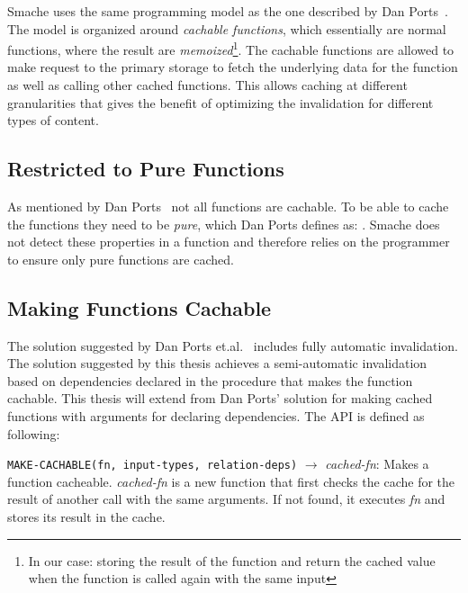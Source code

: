 Smache uses the same programming model as the one described by Dan Ports~\cite{paper:liskov}. The model is organized around \emph{cachable functions}, which essentially are normal functions, where the result are \emph{memoized}\footnote{In our case: storing the result of the function and return the cached value when the function is called again with the same input}. The cachable functions are allowed to make request to the primary storage to fetch the underlying data for the function as well as calling other cached functions. This allows caching at different granularities that gives the benefit of optimizing the invalidation for different types of content.


\subsection{Restricted to Pure Functions}
\label{subsec:restricted_to_pure_functions}

As mentioned by Dan Ports~\cite{paper:liskov} not all functions are cachable. To be able to cache the functions they need to be \emph{pure}, which Dan Ports defines as: . Smache does not detect these properties in a function and therefore relies on the programmer to ensure only pure functions are cached.



\subsection{Making Functions Cachable}
\label{subsec:making-functions-cachable}

The solution suggested by Dan Ports et.al.~\cite{paper:liskov} includes fully automatic invalidation. The solution suggested by this thesis achieves a semi-automatic invalidation based on dependencies declared in the procedure that makes the function cachable. This thesis will extend from Dan Ports' solution for making cached functions with arguments for declaring dependencies. The API is defined as following:

\verb$MAKE-CACHABLE(fn, input-types, relation-deps)$ $\rightarrow$ \emph{cached-fn}: Makes a function cacheable. \emph{cached-fn} is a new function that first checks the cache for the result of another call with the same arguments. If not found, it executes \emph{fn} and stores its result in the cache.

